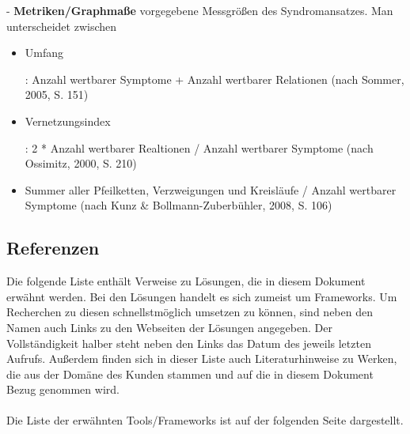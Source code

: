 \documentclass[enabledeprecatedfontcommands,fontsize=11pt,paper=a4,twoside]{scrartcl}
\newcounter{one}
\begin{document}
- \textbf{\hypertarget{Metriken}{Metriken/Graphmaße}} vorgegebene Messgrößen des Syndromansatzes. Man unterscheidet zwischen
\begin{itemize}
\item \hypertarget{Umfang}{Umfang}: Anzahl wertbarer Symptome + Anzahl wertbarer Relationen (nach Sommer, 2005, S. 151)
\item \hypertarget{Vernetzungsindex}{Vernetzungsindex}: 2 * Anzahl wertbarer Realtionen / Anzahl wertbarer Symptome (nach Ossimitz, 2000, S. 210)
\item Summer aller Pfeilketten, Verzweigungen und Kreisläufe / Anzahl wertbarer Symptome (nach Kunz \& Bollmann-Zuberbühler, 2008, S. 106)
\end{itemize}

\newpage
\subsection{Referenzen} 
Die folgende Liste enthält Verweise zu Lösungen, die in diesem Dokument erwähnt werden. Bei den Lösungen handelt es sich zumeist um Frameworks. Um Recherchen zu diesen schnellstmöglich umsetzen zu können, sind neben den Namen auch Links zu den Webseiten der Lösungen angegeben. Der Vollständigkeit halber steht neben den Links das Datum des jeweils letzten Aufrufs. Außerdem finden sich in dieser Liste auch Literaturhinweise zu Werken, die aus der Domäne des Kunden stammen und auf die in diesem Dokument Bezug genommen wird. \\ \\
Die Liste der erwähnten Tools/Frameworks ist auf der folgenden Seite dargestellt. \\
\newpage
\end{document}
